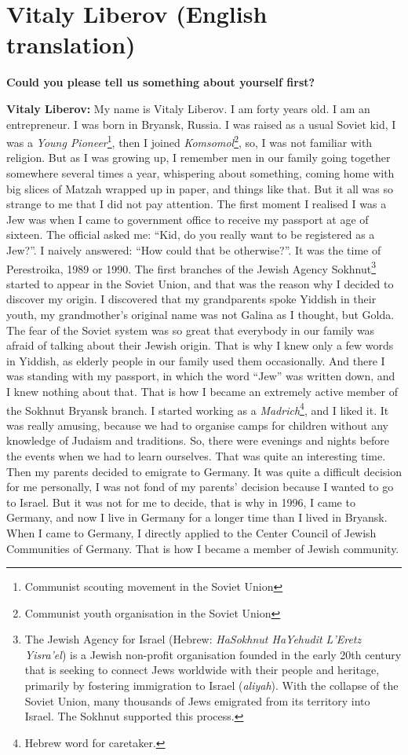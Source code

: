 \section{Vitaly Liberov (English translation)}

\textbf{Could you please tell us something about yourself first?} 

\textbf{Vitaly Liberov:} My name is Vitaly Liberov. I am forty years old. I am an entrepreneur. I was born in Bryansk, Russia. I was raised as a usual Soviet kid, I was a \textit{Young Pioneer}\footnote{Communist scouting movement in the Soviet Union}, then I joined \textit{Komsomol}\footnote{Communist youth organisation in the Soviet Union}, so, I was not familiar with religion. But as I was growing up, I remember men in our family going together somewhere several times a year, whispering about something, coming home with big slices of Matzah wrapped up in paper, and things like that. But it all was so strange to me that I did not pay attention. The first moment I realised I was a Jew was when I came to government office to receive my passport at age of sixteen. The official asked me: “Kid, do you really want to be registered as a Jew?”. I naively answered: “How could that be otherwise?”. It was the time of Perestroika, 1989 or 1990. The first branches of the Jewish Agency Sokhnut\footnote{The Jewish Agency for Israel (Hebrew: \textit{HaSokhnut HaYehudit L'Eretz Yisra'el}) is a Jewish non-profit organisation founded in the early 20th century that is seeking to connect Jews worldwide with their people and heritage, primarily by fostering immigration to Israel (\textit{aliyah}). With the collapse of the Soviet Union, many thousands of Jews emigrated from its territory into Israel. The Sokhnut supported this process.} started to appear in the Soviet Union, and that was the reason why I decided to discover my origin. I discovered that my grandparents spoke Yiddish in their youth, my grandmother’s original name was not Galina as I thought, but Golda. The fear of the Soviet system was so great that everybody in our family was afraid of talking about their Jewish origin. That is why I knew only a few words in Yiddish, as elderly people in our family used them occasionally. And there I was standing with my passport, in which the word “Jew” was written down, and I knew nothing about that. That is how I became an extremely active member of the Sokhnut Bryansk branch. I started working as a \textit{Madrich}\footnote{Hebrew word for caretaker.}, and I liked it.  It was really amusing, because we had to organise camps for children without any knowledge of Judaism and traditions. So, there were evenings and nights before the events when we had to learn ourselves. That was quite an interesting time. Then my parents decided to emigrate to Germany. It was quite a difficult decision for me personally, I was not fond of my parents’ decision because I wanted to go to Israel. But it was not for me to decide, that is why in 1996, I came to Germany, and now I live in Germany for a longer time than I lived in Bryansk. When I came to Germany, I directly applied to the Center Council of Jewish Communities of Germany. That is how I became a member of Jewish community.  

